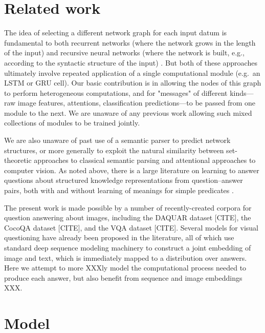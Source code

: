 \documentclass[10pt,twocolumn,letterpaper]{article}
\begin{document}
\section{Related work}

The idea of selecting a different network graph for each input datum is fundamental to both recurrent networks (where the network grows in the length of the input) \cite{Elman90RNN} and recursive neural networks (where the network is built, e.g., according to the syntactic structure of the input) \cite{Socher13CVG}. But both of these approaches ultimately involve repeated application of a single computational module (e.g.\ an LSTM or GRU cell). Our basic contribution is in allowing the nodes of this graph to perform heterogeneous computations, and for "messages" of different kinds---raw image features, attentions, classification predictions---to be passed from one module to the next. We are unaware of any previous work allowing such mixed collections of modules to be trained jointly. 

We are also unaware of past use of a semantic parser to predict network structures, or more generally to exploit the natural similarity between set-theoretic approaches to classical semantic parsing and attentional approaches to computer vision. As noted above, there is a large literature on learning to answer questions about structured knowledge representations from question--answer pairs, both with and without learning of meanings for simple predicates \cite{Liang13DCS,Krish2013Grounded}.

The present work is made possible by a number of recently-created corpora for question answering about images, including the DAQUAR dataset [CITE], the CocoQA dataset [CITE], and the VQA dataset [CITE]. Several models for visual questioning have already been proposed in the literature, all of which use standard deep sequence modeling machinery to construct a joint embedding of image and text, which is immediately mapped to a distribution over answers. Here we attempt to more XXXly model the computational process needed to produce each answer, but also benefit from sequence and image embeddings XXX.

\section{Model}
\end{document}
